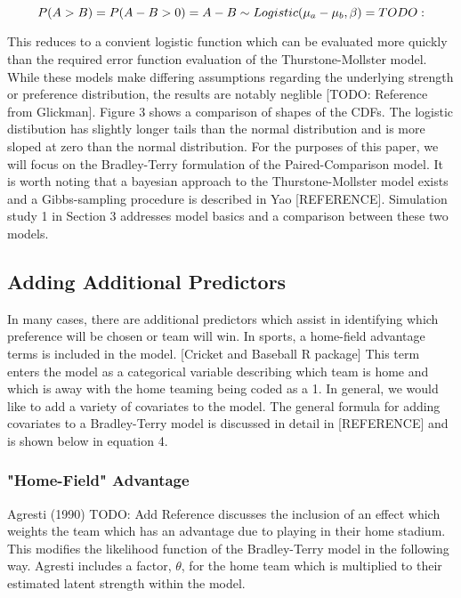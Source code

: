 \documentclass{article}
\begin{document}
\[ P(A > B) = P(A - B > 0)\\
            = A - B \sim Logistic(\mu_a - \mu_b, \beta)
            = TODO: \]
            

This reduces to a convient logistic function which can be evaluated more quickly than the required error function evaluation of the Thurstone-Mollster model. While these models make differing assumptions regarding the underlying strength or preference distribution, the results are notably neglible [TODO: Reference from Glickman]. Figure 3 shows a comparison of shapes of the CDFs. The logistic distibution has slightly longer tails than the normal distribution and is more sloped at zero than the normal distribution. For the purposes of this paper, we will focus on the Bradley-Terry formulation of the Paired-Comparison model. It is worth noting that a bayesian approach to the Thurstone-Mollster model exists and a Gibbs-sampling procedure is described in Yao [REFERENCE]. Simulation study 1 in Section 3 addresses model basics and a comparison between these two models.


\subsection{Adding Additional Predictors}

In many cases, there are additional predictors which assist in identifying which preference will be chosen or team will win. In sports, a home-field advantage terms is included in the model. [Cricket and Baseball R package] This term enters the model as a categorical variable describing which team is home and which is away with the home teaming being coded as a 1. In general, we would like to add a variety of covariates to the model. The general formula for adding covariates to a Bradley-Terry model is discussed in detail in [REFERENCE] and is shown below in equation 4.

\subsubsection{"Home-Field" Advantage}

Agresti (1990) {TODO: Add Reference} discusses the inclusion of an effect which weights the team which has an advantage due to playing in their home stadium. This modifies the likelihood function of the Bradley-Terry model in the following way. Agresti includes a factor, $\theta$, for the home team which is multiplied to their estimated latent strength within the model. 
\end{document}
